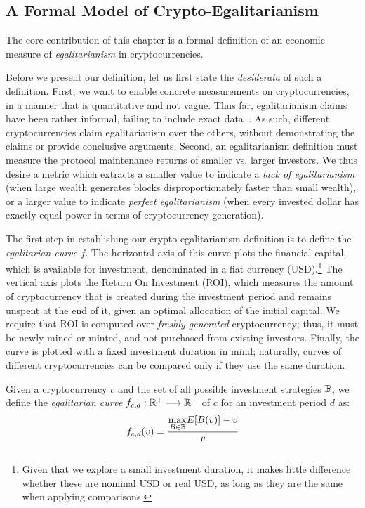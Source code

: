 \subsection{A Formal Model of Crypto-Egalitarianism}\label{sec:definition}

The core contribution of this chapter is a formal definition of an economic
measure of \emph{egalitarianism} in cryptocurrencies.

Before we present our definition, let us first state the \emph{desiderata} of
such a definition. First, we want to enable concrete measurements on
cryptocurrencies, in a manner that is quantitative and not vague. Thus far,
egalitarianism claims have been rather informal, failing to include exact
data~\cite{van2013cryptonote,mcmillan2013}. As such, different cryptocurrencies
claim egalitarianism over the others, without demonstrating the claims or
provide conclusive arguments. Second, an egalitarianism definition must measure
the protocol maintenance returns of smaller vs. larger investors.  We thus
desire a metric which extracts a smaller value to indicate a \emph{lack of
egalitarianism} (\eg when large wealth generates blocks disproportionately
faster than small wealth), or a larger value to indicate \emph{perfect
egalitarianism} (\ie when every invested dollar has exactly equal power in
terms of cryptocurrency generation).

The first step in establishing our crypto-egalitarianism definition is to
define the \emph{egalitarian curve} $f$. The horizontal axis of this curve
plots the financial capital, which is available for investment, denominated in
a fiat currency (USD).\footnote{Given that we explore a small investment
duration, it makes little difference whether these are nominal USD or real USD,
as long as they are the same when applying comparisons.} The vertical axis
plots the Return On Investment (ROI), which measures the amount of
cryptocurrency that is created during the investment period and remains unspent
at the end of it, given an optimal allocation of the initial capital. We
require that ROI is computed over \emph{freshly generated} cryptocurrency;
thus, it must be newly-mined or minted, and not purchased from existing
investors. Finally, the curve is plotted with a fixed investment duration in
mind; naturally, curves of different cryptocurrencies can be compared only if
they use the same duration.

\begin{definition}
    Given a cryptocurrency $c$ and the set of all possible investment
    strategies $\mathbb{B}$, we define the \emph{egalitarian curve} $f_{c,d}:
    \mathbb{R}^+ \longrightarrow \mathbb{R}^+$ of $c$ for an investment period $d$
    as:
    \begin{align}
        f_{c, d}(v) = \frac{\underset{B \in \mathbb{B}}{\max}{E[B(v)]} - v}{v}
    \end{align}
\end{definition}

